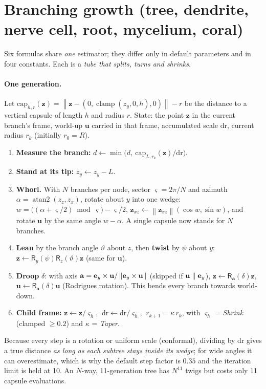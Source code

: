 \documentclass[10pt,a4paper]{article}
\newcommand{\vv}[1]{\mathbf{#1}}
\newcommand{\norm}[1]{\left\lVert#1\right\rVert}
\newcommand{\clamp}{\operatorname{clamp}}
\newcommand{\atantwo}{\operatorname{atan2}}
\newcommand{\Rot}{\mathsf{R}}
\begin{document}
\section{Branching growth (tree, dendrite, nerve cell, root, mycelium, coral)}
\label{sec:branch}
Six formulas share \emph{one} estimator; they differ only in default parameters and in four constants. Each is a \emph{tube that splits, turns and shrinks}.

\paragraph{One generation.} Let $\mathrm{cap}_{h,r}(\vv z)=\norm{\vv z-(0,\clamp(z_y,0,h),0)}-r$ be the distance to a vertical capsule of length $h$ and radius $r$. State: the point $\vv z$ in the current branch's frame, world-up $\vv u$ carried in that frame, accumulated scale $\mathrm{dr}$, current radius $r_k$ (initially $r_0=R$).
\begin{enumerate}
\item \textbf{Measure the branch:} $d\leftarrow\min\!\big(d,\ \mathrm{cap}_{L,r_k}(\vv z)/\mathrm{dr}\big)$.
\item \textbf{Stand at its tip:} $z_y\leftarrow z_y-L$.
\item \textbf{Whorl.} With $N$ branches per node, sector $\varsigma=2\pi/N$ and azimuth $\alpha=\atantwo(z_z,z_x)$, rotate about $y$ into one wedge: $w=\big((\alpha+\varsigma/2)\bmod\varsigma\big)-\varsigma/2$, $\vv z_{xz}\leftarrow\norm{\vv z_{xz}}(\cos w,\sin w)$, and rotate $\vv u$ by the same angle $w-\alpha$. A single capsule now stands for $N$ branches.
\item \textbf{Lean} by the branch angle $\vartheta$ about $z$, then \textbf{twist} by $\psi$ about $y$: $\vv z\leftarrow\Rot_y(\psi)\Rot_z(\vartheta)\vv z$ (same for $\vv u$).
\item \textbf{Droop} $\delta$: with axis $\vv a=\ey\times\vv u/\norm{\ey\times\vv u}$ (skipped if $\vv u\parallel\ey$), $\vv z\leftarrow\Rot_{\vv a}(\delta)\vv z$, $\vv u\leftarrow\Rot_{\vv a}(\delta)\vv u$ (Rodrigues rotation). This bends every branch towards world-down.
\item \textbf{Child frame:} $\vv z\leftarrow\vv z/\varsigma_h$, $\ \mathrm{dr}\leftarrow\mathrm{dr}/\varsigma_h$, $\ r_{k+1}=\kappa\,r_k$, with $\varsigma_h$ = \emph{Shrink} (clamped $\ge0.2$) and $\kappa$ = \emph{Taper}.
\end{enumerate}
Because every step is a rotation or uniform scale (conformal), dividing by $\mathrm{dr}$ gives a true distance \emph{as long as each subtree stays inside its wedge}; for wide angles it can overestimate, which is why the default step factor is $0.35$ and the iteration limit is held at 10. An $N$-way, 11-generation tree has $N^{11}$ twigs but costs only 11 capsule evaluations.
\end{document}
